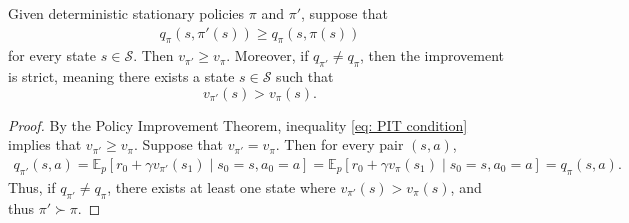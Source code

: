 \begin{lemma}
\label{thm: strict PIT}
Given deterministic stationary policies $\pi$ and $\pi'$, suppose that
\begin{align}
\label{eq: PIT condition}
q_\pi(s,\pi'(s)) \ge q_\pi(s,\pi(s))

\end{align}
for every state $s\in\mathcal S$.
Then \(v_{\pi'} \ge v_\pi\). Moreover, if \(q_{\pi'}\neq q_\pi\), then the improvement is strict, meaning
there exists a state \(s\in\mathcal S\) such that
\[
v_{\pi'}(s)>v_\pi(s).
\]
\end{lemma}
\begin{proof}
By the Policy Improvement Theorem, inequality \eqref{eq: PIT condition} implies that $v_{\pi'} \ge v_\pi$.
Suppose that $v_{\pi'} = v_{\pi}$. Then for every pair $(s,a)$,
\begin{align*}
q_{\pi'}(s,a)
= \mathbb E_p\!\left[r_0+\gamma v_{\pi'}(s_1)\mid s_0=s,a_0=a\right]
= \mathbb E_p\!\left[r_0+\gamma v_{\pi}(s_1)\mid s_0=s,a_0=a\right]
= q_{\pi}(s,a) .
\end{align*}
Thus, if $q_{\pi'} \neq q_\pi$, there exists at least one state where $v_{\pi'}(s) > v_{\pi}(s)$, and thus $\pi' \succ \pi$.
\end{proof}

